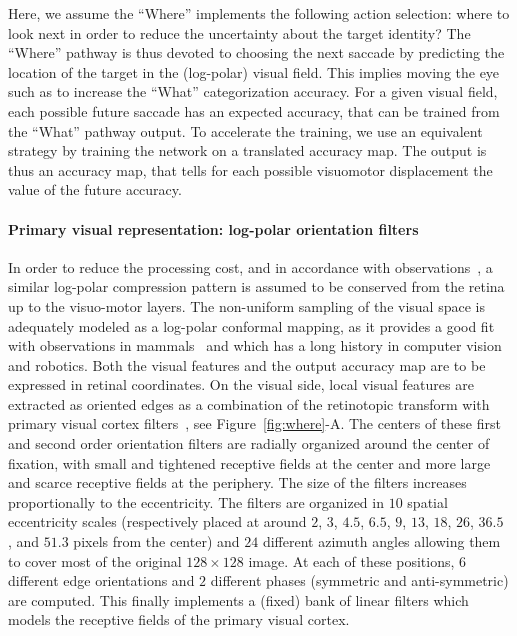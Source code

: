 Here, we assume the ``Where'' implements the following action selection: where to look next in order to reduce the uncertainty about the target identity?
The ``Where'' pathway is thus devoted to choosing the next saccade by predicting the location of the target in the (log-polar) visual field.
This implies moving the eye such as to increase the ``What'' categorization accuracy. For a given visual field, each possible future saccade has an expected accuracy, that can be trained from the ``What'' pathway output. To accelerate the training, we use an equivalent strategy by training the network on a translated accuracy map. The output is thus an accuracy map, that tells for each possible visuomotor displacement the value of the future accuracy.

\paragraph{Primary visual representation: log-polar orientation filters}
In order to reduce the processing cost, and in accordance with observations~\cite{connolly1984representation,sparks1987sensory}, a similar log-polar compression pattern is assumed to be conserved from the retina up to the visuo-motor layers.
The non-uniform sampling of the visual space is adequately modeled as a log-polar conformal mapping, as it provides a good fit with observations in mammals~\cite{Traver10} and which has a long history in computer vision and robotics. Both the visual features and the output accuracy map are to be expressed in retinal coordinates. On the visual side, local visual features are extracted as oriented edges as a combination of the retinotopic transform with primary visual cortex filters~\cite{Fischer2007a}, see Figure~\ref{fig:where}-A. The centers of these first and second order orientation filters are radially organized around the center of fixation, with small and tightened receptive fields at the center and more large and scarce receptive fields at the periphery. The size of the filters increases proportionally to the eccentricity.  The filters are organized in $10$ spatial eccentricity scales (respectively placed at around $2$, $3$, $4.5$, $6.5$, $9$, $13$, $18$, $26$, $36.5$ , and $51.3$ pixels from the center) and $24$ different azimuth angles allowing them to cover most of the original $128 \times 128 $ image. At each of these positions, $6$ different edge orientations and $2$ different phases (symmetric and anti-symmetric) are computed. This finally implements a (fixed) bank of linear filters which models the receptive fields of the primary visual cortex.

